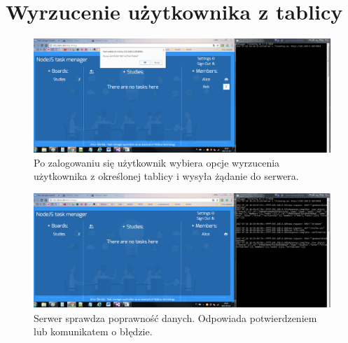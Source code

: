 \documentclass[12pt]{report}
\begin{document}
\section{Wyrzucenie użytkownika z tablicy}
\begin{figure}[!hb]
\centering
\includegraphics[width=\textwidth,height=\textheight,keepaspectratio]{91.png}
\captionsetup{labelformat=empty}
\caption[]{Po zalogowaniu się użytkownik wybiera opcje wyrzucenia użytkownika z określonej tablicy i wysyła żądanie do serwera.}
\end{figure}
\begin{figure}[!hb]
\centering
\includegraphics[width=\textwidth,height=\textheight,keepaspectratio]{92.png}
\captionsetup{labelformat=empty}
\caption[]{Serwer sprawdza poprawność danych. Odpowiada potwierdzeniem lub komunikatem o błędzie.}
\end{figure}
\end{document}
